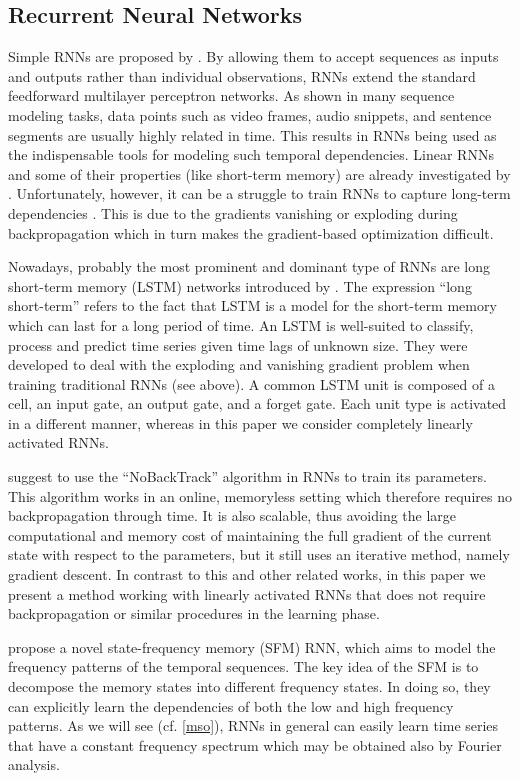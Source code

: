 \documentclass[twoside,11pt]{article}
\theoremstyle{definition}
\begin{document}
\subsection{Recurrent Neural Networks}

Simple RNNs are proposed by \citet{Elm90}. By allowing them to accept sequences
as inputs and outputs rather than individual observations, RNNs extend the
standard feedforward multilayer perceptron networks. As shown in many sequence
modeling tasks, data points such as video frames, audio snippets, and sentence
segments are usually highly related in time. This results in RNNs being used as
the indispensable tools for modeling such temporal dependencies. Linear RNNs and
some of their properties (like short-term memory) are already investigated by
\citet{WLS94}. Unfortunately, however, it can be a struggle to train RNNs to
capture long-term dependencies \citep{BSF94,PMB13}. This is due to the
gradients vanishing or exploding during backpropagation which in turn makes the
gradient-based optimization difficult.

Nowadays, probably the most prominent and dominant type of RNNs are long
short-term memory (LSTM) networks introduced by \citet{HS97}. The expression \enquote{long
short-term} refers to the fact that LSTM is a model for the short-term memory
which can last for a long period of time. An LSTM is well-suited to classify,
process and predict time series given time lags of unknown size. They were
developed to deal with the exploding and vanishing gradient problem when
training traditional RNNs (see above). A common LSTM unit is composed of a cell,
an input gate, an output gate, and a forget gate. Each unit type is activated in
a different manner, whereas in this paper we consider completely linearly
activated RNNs.

\citet{OTC15} suggest to use the \enquote{NoBackTrack} algorithm in RNNs to
train its parameters. This algorithm works in an online, memoryless setting
which therefore requires no backpropagation through time. It is also scalable,
thus avoiding the large computational and memory cost of maintaining the full
gradient of the current state with respect to the parameters, but it still uses
an iterative method, namely gradient descent. In contrast to this and other
related works, in this paper we present a method working with linearly activated
RNNs that does not require backpropagation or similar procedures in the learning
phase.

\citet{HQ17} propose a novel state-frequency memory (SFM) RNN,
which aims to model the frequency patterns of the temporal sequences.
The key idea of the SFM is to decompose the memory states into different
frequency states. In doing so, they can explicitly learn the dependencies of
both the low and high frequency patterns. As we will see (cf. \cref{mso}),
RNNs in general can easily learn time series that have a constant frequency
spectrum which may be obtained also by Fourier analysis.
\end{document}
